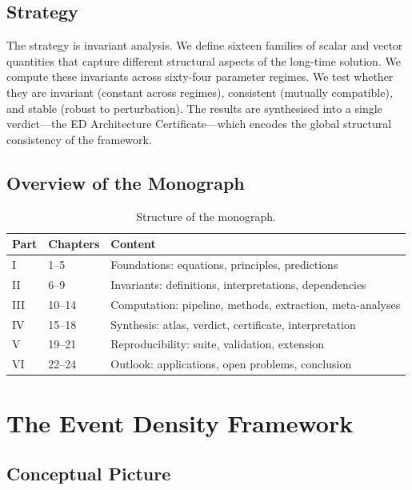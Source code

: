\documentclass[11pt,twoside,openright]{book}
\theoremstyle{definition}
\theoremstyle{plain}
\theoremstyle{definition}
\theoremstyle{remark}
\begin{document}
\section{Strategy}\label{sec:strategy}

The strategy is invariant analysis. We define sixteen families of scalar and vector quantities that capture different structural aspects of the long-time solution. We compute these invariants across sixty-four parameter regimes. We test whether they are invariant (constant across regimes), consistent (mutually compatible), and stable (robust to perturbation). The results are synthesised into a single verdict---the ED Architecture Certificate---which encodes the global structural consistency of the framework.

\section{Overview of the Monograph}\label{sec:overview}

\begin{table}[h]
\centering
\caption{Structure of the monograph.}\label{tab:overview}
\begin{tabular}{@{}lll@{}}
\toprule
Part & Chapters & Content \\
\midrule
I   & 1--5   & Foundations: equations, principles, predictions \\
II  & 6--9   & Invariants: definitions, interpretations, dependencies \\
III & 10--14 & Computation: pipeline, methods, extraction, meta-analyses \\
IV  & 15--18 & Synthesis: atlas, verdict, certificate, interpretation \\
V   & 19--21 & Reproducibility: suite, validation, extension \\
VI  & 22--24 & Outlook: applications, open problems, conclusion \\
\bottomrule
\end{tabular}
\end{table}


\chapter{The Event Density Framework}\label{ch:framework}

\section{Conceptual Picture}\label{sec:conceptual}
\end{document}

